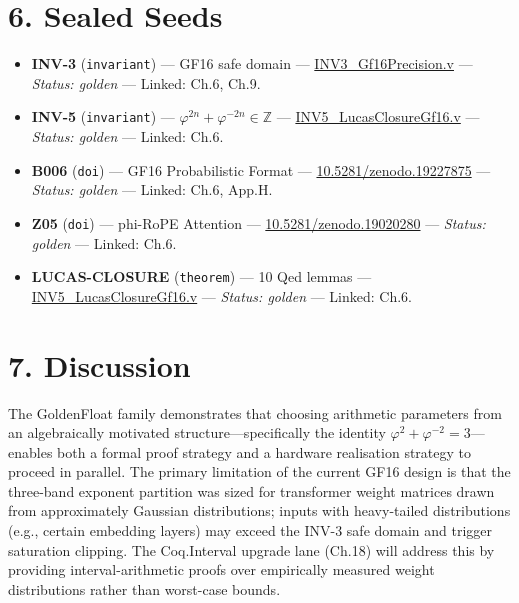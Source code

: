 \section{6. Sealed Seeds}\label{fa_06:sealed-seeds}

\begin{itemize}
\item
  \textbf{INV-3} (\texttt{invariant}) --- GF16
  safe domain ---
  \href{https://github.com/gHashTag/t27/blob/feat/canonical-coq-home/proofs/canonical/igla/INV3_Gf16Precision.v}{INV3\_Gf16Precision.v}
  --- \emph{Status: golden} --- Linked: Ch.6,
  Ch.9.
\item
  \textbf{INV-5} (\texttt{invariant}) ---
  \(\varphi^{2n}+\varphi^{-2n} \in \mathbb{Z}\)
  ---
  \href{https://github.com/gHashTag/t27/blob/feat/canonical-coq-home/proofs/canonical/igla/INV5_LucasClosureGf16.v}{INV5\_LucasClosureGf16.v}
  --- \emph{Status: golden} --- Linked: Ch.6.
\item
  \textbf{B006} (\texttt{doi}) --- GF16
  Probabilistic Format ---
  \href{https://doi.org/10.5281/zenodo.19227875}{10.5281/zenodo.19227875}
  --- \emph{Status: golden} --- Linked: Ch.6,
  App.H.
\item
  \textbf{Z05} (\texttt{doi}) --- phi-RoPE
  Attention ---
  \href{https://doi.org/10.5281/zenodo.19020280}{10.5281/zenodo.19020280}
  --- \emph{Status: golden} --- Linked: Ch.6.
\item
  \textbf{LUCAS-CLOSURE} (\texttt{theorem}) --- 10
  Qed lemmas ---
  \href{https://github.com/gHashTag/t27/blob/feat/canonical-coq-home/proofs/canonical/igla/INV5_LucasClosureGf16.v}{INV5\_LucasClosureGf16.v}
  --- \emph{Status: golden} --- Linked: Ch.6.
\end{itemize}

\section{7. Discussion}\label{fa_06:discussion}

The GoldenFloat family demonstrates that choosing
arithmetic parameters from an algebraically
motivated structure---specifically the identity
\(\varphi^2+\varphi^{-2}=3\)---enables both a
formal proof strategy and a hardware realisation
strategy to proceed in parallel. The primary
limitation of the current GF16 design is that the
three-band exponent partition was sized for
transformer weight matrices drawn from
approximately Gaussian distributions; inputs with
heavy-tailed distributions (e.g., certain
embedding layers) may exceed the INV-3 safe domain
and trigger saturation clipping. The Coq.Interval
upgrade lane (Ch.18) will address this by
providing interval-arithmetic proofs over
empirically measured weight distributions rather
than worst-case bounds.

